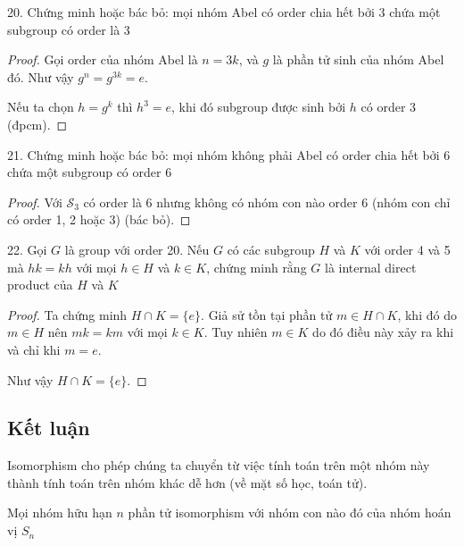 20. Chứng minh hoặc bác bỏ: mọi nhóm Abel có order chia hết bởi 3 chứa một subgroup có order là 3

\begin{proof}
    Gọi order của nhóm Abel là $n=3k$, và $g$ là phần tử sinh của nhóm Abel đó. Như vậy $g^n = g^{3k} = e$.

    Nếu ta chọn $h = g^k$ thì $h^3 = e$, khi đó subgroup được sinh bởi $h$ có order 3 (đpcm).
\end{proof}

21. Chứng minh hoặc bác bỏ: mọi nhóm không phải Abel có order chia hết bởi 6 chứa một subgroup có order 6

\begin{proof}
    Với $\mathcal{S}_3$ có order là 6 nhưng không có nhóm con nào order 6 (nhóm con chỉ có order 1, 2 hoặc 3) (bác bỏ).
\end{proof}

22. Gọi $G$ là group với order 20. Nếu $G$ có các subgroup $H$ và $K$ với order 4 và 5 mà $hk=kh$ với mọi $h \in H$ và $k \in K$, chứng minh rằng $G$ là internal direct product của $H$ và $K$

\begin{proof}
    Ta chứng minh $H \cap K = \{ e \}$. Giả sử tồn tại phần tử $m \in H \cap K$, khi đó do $m \in H$ nên $mk = km$ với mọi $k \in K$. Tuy nhiên $m \in K$ do đó điều này xảy ra khi và chỉ khi $m = e$.

    Như vậy $H \cap K = \{ e \}$.
\end{proof}

\subsection*{Kết luận}

Isomorphism cho phép chúng ta chuyển từ việc tính toán trên một nhóm này thành tính toán trên nhóm khác dễ hơn (về mặt số học, toán tử).

\begin{theorem}
    Mọi nhóm hữu hạn $n$ phần tử isomorphism với nhóm con nào đó của nhóm hoán vị $S_n$
\end{theorem}
